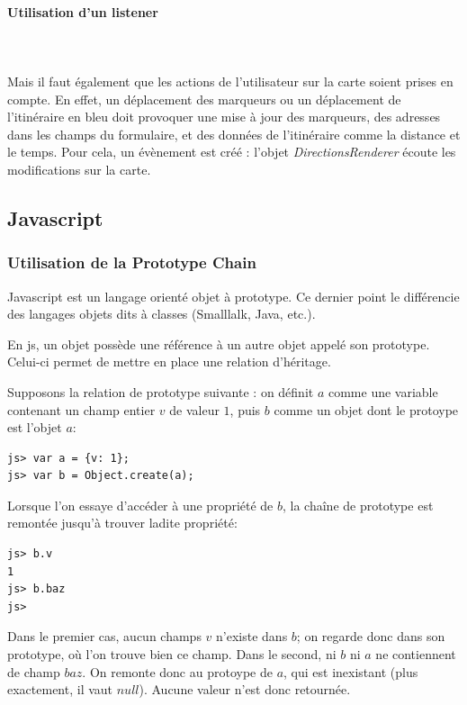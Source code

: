 \documentclass[a4paper]{article}
\begin{document}
\paragraph{Utilisation d'un listener}
~~\\
\\
Mais il faut également que les actions de l'utilisateur sur la carte soient prises en compte.
En effet, un déplacement des marqueurs ou un déplacement de l'itinéraire en bleu doit
provoquer une mise à jour des marqueurs, des adresses dans les champs du formulaire,
et des données de l'itinéraire comme la distance et le temps. Pour cela,
un évènement est créé : l'objet \textit{DirectionsRenderer} écoute les modifications sur la carte.

\subsection{Javascript}

\subsubsection{Utilisation de la Prototype Chain}
Javascript est un langage orienté objet à prototype. Ce dernier point
le différencie des langages objets dits à classes (Smalllalk, Java, etc.).

En js, un objet possède une référence à un autre objet appelé son prototype.
Celui-ci permet de mettre en place une relation d'héritage.

Supposons la relation de prototype suivante : on définit $a$ comme une variable
contenant un champ entier $v$ de valeur $1$, puis $b$ comme un objet dont
le protoype est l'objet $a$:
\begin{verbatim}
js> var a = {v: 1};
js> var b = Object.create(a);
\end{verbatim}

Lorsque l'on essaye d'accéder à une propriété de $b$, la chaîne de prototype
est remontée jusqu'à trouver ladite propriété:
\begin{verbatim}
js> b.v
1
js> b.baz
js>
\end{verbatim}

Dans le premier cas, aucun champs $v$ n'existe dans $b$; on regarde donc
dans son prototype, où l'on trouve bien ce champ. Dans le second, ni $b$
ni $a$ ne contiennent de champ $baz$. On remonte donc au protoype de $a$,
qui est inexistant (plus exactement, il vaut $null$). Aucune valeur n'est
donc retournée.
\end{document}
